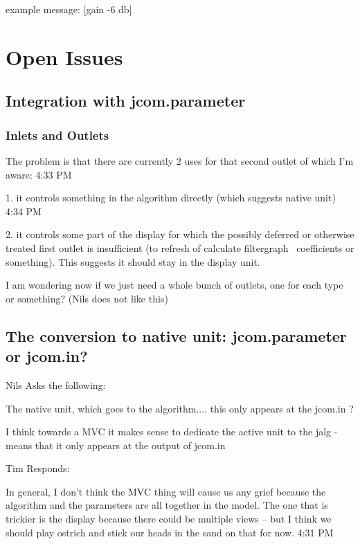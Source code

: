 \documentclass[]{article}
\begin{document}
example message:     [gain -6 db]





\section{Open Issues}

\subsection{Integration with jcom.parameter}

\subsubsection{Inlets and Outlets}

The problem is that there are currently 2 uses for that second outlet of which I'm aware:
4:33 PM
 
1. it controls something in the algorithm directly (which suggests native unit)
4:34 PM
 
2. it controls some part of the display for which the possibly deferred or otherwise treated first outlet is insufficient (to refresh of calculate filtergraph~ coefficients or something).  This suggests it should stay in the display unit.


 I am wondering now if we just need a whole bunch of outlets, one for each type or something?  (Nils does not like this)




\subsection{The conversion to native unit: jcom.parameter or jcom.in?}

Nils Asks the following:

The native unit, which goes to the algorithm....  this only appears at the jcom.in ?

I think towards a MVC it makes sense to dedicate the active unit to the jalg - means that it only appears at the output of jcom.in


Tim Responds:

In general, I don't think the MVC thing will cause us any grief because the algorithm and the parameters are all together in the model.  The one that is trickier is the display because there could be multiple views -- but I think we should play ostrich and stick our heads in the sand on that for now.
4:31 PM
 
\end{document}
